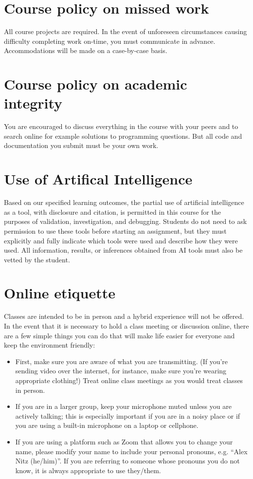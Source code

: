 \documentclass[12pt]{article}
\begin{document}
\clearpage

\section*{Course policy on missed work}

All course projects are required. In the event of unforeseen circumstances causing difficulty completing work on-time, you must communicate in advance. Accommodations will be made on a case-by-case basis.

\section*{Course policy on academic integrity}

You are encouraged to discuss everything in the course with your peers and to search online for example solutions to programming questions. But all code and documentation you submit must be your own work.

\section*{Use of Artifical Intelligence}

Based on our specified learning outcomes, the partial use of artificial intelligence as a tool, with disclosure and citation, is permitted in this course for the purposes of validation, investigation, and debugging. Students do not need to ask permission to use these tools before starting an assignment, but they must explicitly and fully indicate which tools were used and describe how they were used. All information, results, or inferences obtained from AI tools must also be vetted by the student.

\section*{Online etiquette}

Classes are intended to be in person and a hybrid experience will not be offered. In the event that it is necessary
to hold a class meeting or discussion online, there are a few simple things you can do that will make life easier for everyone and keep the environment friendly:
\begin{itemize}
\item First, make sure you are aware of what you are transmitting. (If you’re sending video over the internet, for instance, make sure you’re wearing appropriate clothing!) Treat online class meetings as you would treat classes in person.
\item If you are in a larger group, keep your microphone muted unless you are actively talking; this is especially important if you are in a noisy place or if you are using a built-in microphone on a laptop or cellphone.
\item If you are using a platform such as Zoom that allows you to change your name, please modify your name to include your personal pronouns, e.g. “Alex Nitz (he/him)”. If you are referring to someone whose pronouns you do not know, it is always appropriate to use they/them.
\end{itemize}
\end{document}
